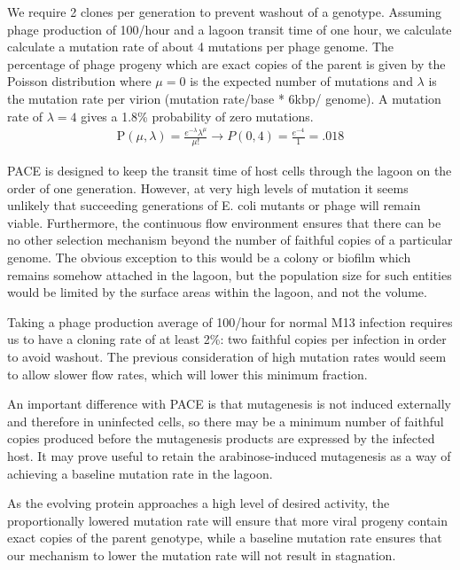 \documentclass[10pt,letterpaper]{article}
\begin{document}
We require 2 clones per generation to prevent washout of a genotype. Assuming phage production of 100/hour and a lagoon transit time of one hour, we calculate calculate a mutation rate of about 4 mutations per phage genome.  The percentage of phage progeny which are exact copies of the parent is given by the Poisson distribution where $\mu = 0$ is the expected number of mutations and $\lambda$ is the mutation rate per virion (mutation rate/base * 6kbp/ genome).
A mutation rate of $\lambda = 4$ gives a 1.8\% probability of zero mutations.
\vskip 0.2cm
\begin{eqnarray}
\label{eq:POC}
\mathrm{P}\left( \mu, \lambda \right) = \frac{{e^{ - \lambda } \lambda ^ \mu }}{{\mu!}}
 \rightarrow P(0,4) = \frac{{e^{ - 4 }}}{{1}} = .018
\end{eqnarray}

PACE is designed to keep the transit time of host cells through the lagoon on the order of one generation.  However, at very high levels of mutation it seems unlikely that succeeding generations of E. coli mutants or phage will remain viable. Furthermore, the continuous flow environment ensures that there can be no other selection mechanism beyond the number of faithful copies of a particular genome.  The obvious exception to this would be a colony or biofilm which remains somehow attached in the lagoon, but the population size for such entities would be limited by the surface areas within the lagoon, and not the volume.

Taking a phage production average of 100/hour for normal M13 infection requires us to have a cloning rate of at least 2\%: two faithful copies per infection in order to avoid washout.  The previous consideration of high mutation rates would seem to allow slower flow rates, which will lower this minimum fraction.

An important difference with PACE is that mutagenesis is not induced externally and therefore in uninfected cells, so there may be a minimum number of faithful copies produced before the mutagenesis products are expressed by the infected host.  It may prove useful to retain the arabinose-induced mutagenesis as a way of achieving a baseline mutation rate in the lagoon.

As the evolving protein approaches a high level of desired activity, the proportionally lowered mutation rate will ensure that more viral progeny contain exact copies of the parent genotype, while a baseline mutation rate ensures that our mechanism to lower the mutation rate will not result in stagnation.
\end{document}
